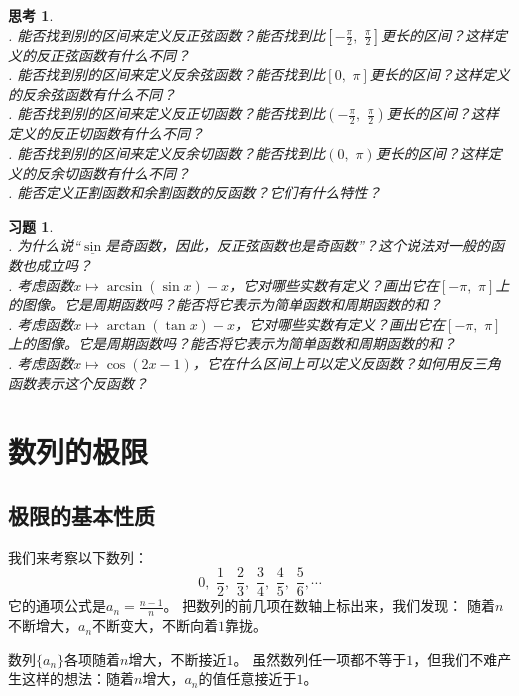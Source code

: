 \documentclass[12pt,UTF8]{ctexbook}
\newtheorem{sk}{思考}[section]
\newtheorem{xt}{习题}[section]
\begin{document}
\begin{sk}
    \mbox{} \\
    . 能否找到别的区间来定义反正弦函数？能否找到比$[-\frac{\pi}{2}, \,\, \frac{\pi}{2}]$更长的区间？这样定义的反正弦函数有什么不同？\\
    . 能否找到别的区间来定义反余弦函数？能否找到比$[0, \,\, \pi]$更长的区间？这样定义的反余弦函数有什么不同？\\
    . 能否找到别的区间来定义反正切函数？能否找到比$(-\frac{\pi}{2}, \,\, \frac{\pi}{2})$更长的区间？这样定义的反正切函数有什么不同？\\
    . 能否找到别的区间来定义反余切函数？能否找到比$(0, \,\, \pi)$更长的区间？这样定义的反余切函数有什么不同？\\
    . 能否定义正割函数和余割函数的反函数？它们有什么特性？
\end{sk}
\begin{xt}
    \mbox{} \\
    . 为什么说“$\underline{\sin}$是奇函数，因此，反正弦函数也是奇函数”？这个说法对一般的函数也成立吗？\\
    . 考虑函数$x\mapsto \arcsin{(\sin{x})} - x$，它对哪些实数有定义？画出它在$[-\pi, \,\, \pi]$上的图像。它是周期函数吗？能否将它表示为简单函数和周期函数的和？\\
    . 考虑函数$x\mapsto \arctan{(\tan{x})} - x$，它对哪些实数有定义？画出它在$[-\pi, \,\, \pi]$上的图像。它是周期函数吗？能否将它表示为简单函数和周期函数的和？\\
    . 考虑函数$x\mapsto \cos(2x - 1)$，它在什么区间上可以定义反函数？如何用反三角函数表示这个反函数？
\end{xt}


\chapter{数列的极限}

\section{极限的基本性质}
我们来考察以下数列：
$$ 0,\,\, \frac{1}{2}, \,\,\frac{2}{3},\,\, \frac{3}{4}, \,\,\frac{4}{5}, \,\,\frac{5}{6}, \cdots $$
它的通项公式是$a_n = \frac{n-1}{n}$。
把数列的前几项在数轴上标出来，我们发现：
随着$n$不断增大，$a_n$不断变大，不断向着$1$靠拢。

数列$\{a_n\}$各项随着$n$增大，不断接近$1$。
虽然数列任一项都不等于$1$，但我们不难产生这样的想法：随着$n$增大，$a_n$的值任意接近于$1$。
\end{document}
